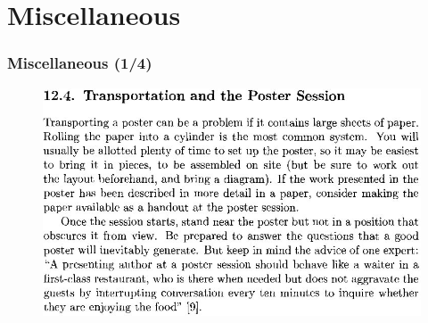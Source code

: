 \documentclass{beamer}
\begin{document}
\section{Miscellaneous}
\begin{frame}
\frametitle{Miscellaneous (1/4)}
\begin{figure}[t]
 \includegraphics[width=\textwidth]{images/poster.jpeg}
\end{figure}
\end{frame}
\end{document}
